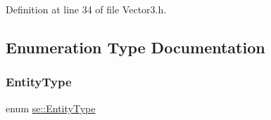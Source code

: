 Definition at line 34 of file Vector3.\+h.



\subsection{Enumeration Type Documentation}
\mbox{\label{namespacese_ae73a909a94998bc95235eb9b16e405f1}} 
\subsubsection{\texorpdfstring{Entity\+Type}{EntityType}}
{\footnotesize\ttfamily enum \mbox{\hyperlink{namespacese_ae73a909a94998bc95235eb9b16e405f1}{se\+::\+Entity\+Type}}}

